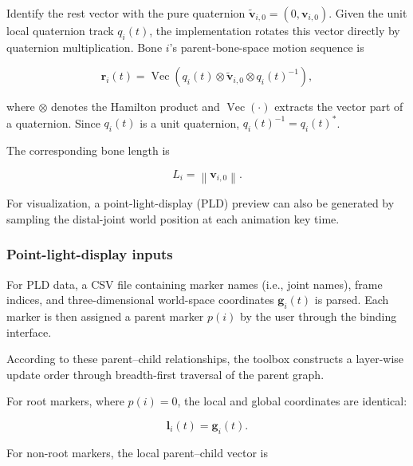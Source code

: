 \documentclass[12pt]{article}
\begin{document}
Identify the rest vector with the pure quaternion
$\widetilde{\mathbf{v}}_{i,0}=(0,\mathbf{v}_{i,0})$. Given the unit local
quaternion track $q_i(t)$, the implementation rotates this vector directly
by quaternion multiplication. Bone $i$'s parent-bone-space motion sequence is

\begin{equation}
\mathbf{r}_i(t)
=
\operatorname{Vec}\!\left(
q_i(t)\otimes\widetilde{\mathbf{v}}_{i,0}\otimes q_i(t)^{-1}
\right),
\label{eq:sup-skeletal-parent-space}
\end{equation}

where $\otimes$ denotes the Hamilton product and $\operatorname{Vec}(\cdot)$
extracts the vector part of a quaternion. Since $q_i(t)$ is a unit
quaternion, $q_i(t)^{-1}=q_i(t)^{*}$.

The corresponding bone length is

\begin{equation}
L_i
=
\left\|\mathbf{v}_{i,0}\right\|.
\label{eq:sup-skeletal-length}
\end{equation}

For visualization, a point-light-display (PLD) preview can also be
generated by sampling the distal-joint world position at each animation
key time.


\subsubsection{Point-light-display inputs}
\label{sup:pld-input}

For PLD data, a CSV file containing marker names (i.e., joint
names), frame indices, and three-dimensional world-space coordinates
$\mathbf{g}_i(t)$ is parsed. Each marker is then assigned a parent marker
$p(i)$ by the user through the binding interface.

According to these parent--child relationships, the toolbox constructs
a layer-wise update order through breadth-first traversal of the parent
graph.

For root markers, where $p(i)=0$, the local and global coordinates are
identical:

\begin{equation}
\mathbf{l}_i(t)
=
\mathbf{g}_i(t).
\label{eq:sup-root-local}
\end{equation}

For non-root markers, the local parent--child vector is
\end{document}
